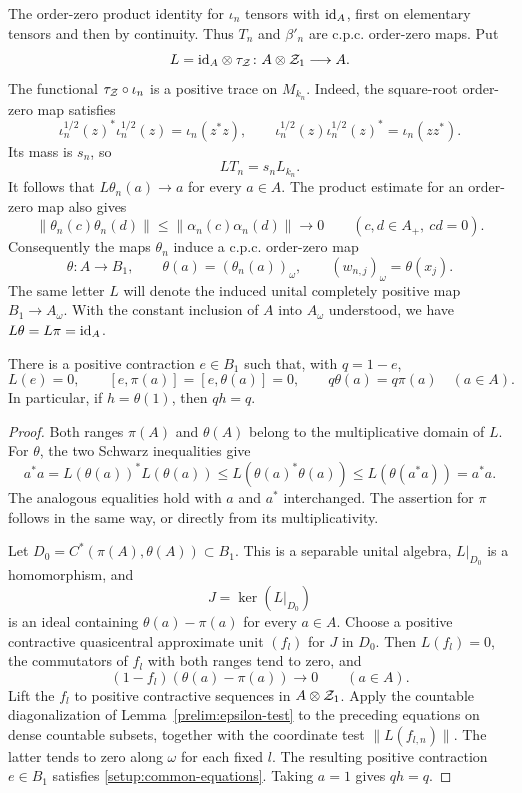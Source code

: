 The order-zero product identity for $\iota_n$ tensors with
$\mathrm{id}_A$, first on elementary tensors and then by continuity.  Thus
$T_n$ and $\beta'_n$ are c.p.c. order-zero maps.  Put
\[
 L=\mathrm{id}_A\otimes\tau_{\mathcal Z}\colon A\otimes\mathcal Z_1\longrightarrow A.
\]
The functional $\tau_{\mathcal Z}\circ\iota_n$ is a positive trace on
$M_{k_n}$.  Indeed, the square-root order-zero map satisfies
\[
 \iota_n^{1/2}(z)^*\iota_n^{1/2}(z)=\iota_n(z^*z),
 \qquad
 \iota_n^{1/2}(z)\iota_n^{1/2}(z)^*=\iota_n(zz^*).
\]
Its mass is $s_n$, so
\[
 LT_n=s_nL_{k_n}.
\]
It follows that $L\theta_n(a)\to a$ for every $a\in A$.
The product estimate for an order-zero map also gives
\[
 \|\theta_n(c)\theta_n(d)\|
 \leq\|\alpha_n(c)\alpha_n(d)\|\longrightarrow0
 \qquad(c,d\in A_+,\ cd=0).
\]
Consequently the maps $\theta_n$ induce a c.p.c. order-zero map
\begin{equation}\label{setup:theta}
 \theta\colon A\longrightarrow B_1,
 \qquad \theta(a)=(\theta_n(a))_\omega,
 \qquad (w_{n,j})_\omega=\theta(x_j).
\end{equation}
The same letter $L$ will denote the induced unital completely positive
map $B_1\to A_\omega$.  With the constant inclusion of $A$ into
$A_\omega$ understood, we have $L\theta=L\pi=\mathrm{id}_A$.

\begin{lemma}\label{setup:common}
There is a positive contraction $e\in B_1$ such that, with $q=1-e$,
\begin{equation}\label{setup:common-equations}
 L(e)=0,\qquad
 [e,\pi(a)]=[e,\theta(a)]=0,\qquad
 q\theta(a)=q\pi(a)
 \quad(a\in A).
\end{equation}
In particular, if $h=\theta(1)$, then $qh=q$.
\end{lemma}

\begin{proof}
Both ranges $\pi(A)$ and $\theta(A)$ belong to the multiplicative
domain of $L$.  For $\theta$, the two Schwarz inequalities give
\[
 a^*a=L(\theta(a))^*L(\theta(a))
 \leq L(\theta(a)^*\theta(a))
 \leq L(\theta(a^*a))=a^*a.
\]
The analogous equalities hold with $a$ and $a^*$ interchanged.
The assertion for $\pi$ follows in the same way, or directly from
its multiplicativity.

Let $D_0=C^*(\pi(A),\theta(A))\subset B_1$.  This is a separable
unital algebra, $L|_{D_0}$ is a homomorphism, and
\[
 J=\ker(L|_{D_0})
\]
is an ideal containing $\theta(a)-\pi(a)$ for every $a\in A$.
Choose a positive contractive quasicentral approximate unit $(f_l)$
for $J$ in $D_0$.  Then $L(f_l)=0$, the commutators of $f_l$ with
both ranges tend to zero, and
\[
 (1-f_l)(\theta(a)-\pi(a))\longrightarrow0
 \qquad(a\in A).
\]
Lift the $f_l$ to positive contractive sequences in
$A\otimes\mathcal Z_1$.  Apply the countable diagonalization of
Lemma~\ref{prelim:epsilon-test} to the preceding equations on dense
countable subsets, together with the coordinate test
$\|L(f_{l,n})\|$.  The latter tends to zero along $\omega$ for each
fixed $l$.  The resulting positive contraction $e\in B_1$ satisfies
\eqref{setup:common-equations}.  Taking $a=1$ gives $qh=q$.
\end{proof}

